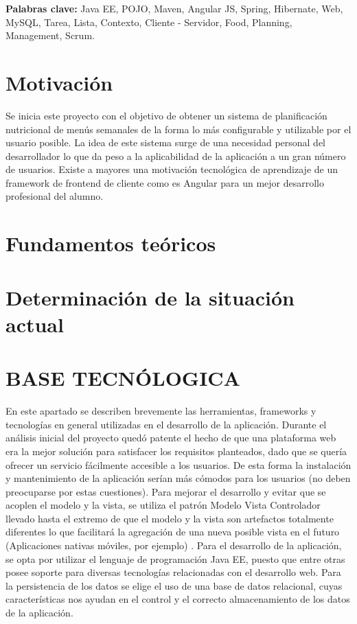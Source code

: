 \documentclass[12pt, a4paper, twoside]{book}
\begin{document}
	
	\textbf{Palabras clave:} Java EE, POJO, Maven, Angular JS, Spring, Hibernate, Web, MySQL, Tarea, Lista, Contexto, Cliente - Servidor, Food, Planning, Management, Scrum. 
	
	
	\renewcommand{\contentsname}{Índice de contenidos}
	\renewcommand{\listfigurename}{Índice de figuras}
	\renewcommand{\listtablename}{Índice de tablas}
	
	\tableofcontents %
	
	\listoffigures %
	
	\listoftables %
	
	\clearpage
	
	\chapter{Motivación}
	Se inicia este proyecto con el objetivo de obtener un sistema de planificación nutricional de menús semanales de la forma lo más configurable y utilizable por el usuario posible.
	La idea de este sistema surge de una necesidad personal del desarrollador lo que da peso a la aplicabilidad de la aplicación a un gran número de usuarios.
	Existe a mayores una motivación tecnológica de aprendizaje de un framework de frontend de cliente como es Angular para un mejor desarrollo profesional del alumno.
	\chapter{Fundamentos teóricos}
	
	\chapter{Determinación de la situación actual}
	\chapter{BASE TECNÓLOGICA}
	En este apartado se describen brevemente las herramientas, frameworks y tecnologías en general utilizadas en el desarrollo de la aplicación. Durante el análisis inicial del proyecto quedó patente el hecho de que una plataforma web era la mejor solución para satisfacer los requisitos planteados, dado que se quería ofrecer un servicio fácilmente accesible a los usuarios. De esta forma la instalación y mantenimiento de la aplicación serían más cómodos para los usuarios (no deben preocuparse por estas cuestiones). Para mejorar el desarrollo y evitar que se acoplen el modelo y la vista, se utiliza el patrón Modelo Vista Controlador llevado hasta el extremo de que el modelo y la vista son artefactos totalmente diferentes lo que facilitará la agregación de una nueva posible vista en el futuro (Aplicaciones nativas móviles, por ejemplo) .
	Para el desarrollo de la aplicación, se opta por utilizar el lenguaje de programación Java EE, puesto que entre otras posee soporte para diversas tecnologías relacionadas con el desarrollo web.
	Para la persistencia de los datos se elige el uso de una base de datos relacional, cuyas características nos ayudan en el control y el correcto almacenamiento de los datos de la aplicación.	
\end{document}
